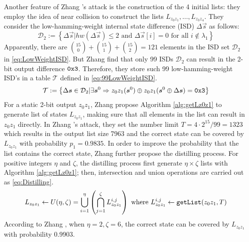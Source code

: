 Another feature of Zhang \etal's attack is the construction of the 4 initial lists: they employ the idea of near collision to construct the lists $L_{z_0z_1},\ldots, L_{z_3z_4}$.
They consider the low-hamming-weight internal state difference (ISD) $\Delta \vec{s}$ as follows:
\begin{equation}\label{eq:LowWeightISD}
  \mathcal{D}_2:=\left\{\Delta\vec{s}| hw(\Delta\vec{s})\leq 2 \text{ and } \Delta\vec{s}[i]=0  \text{ for all } i\notin\lambda_1 \right\}
\end{equation}
Apparently, there are $\binom{15}{0}+\binom{15}{1}+\binom{15}{2}=121$ elements in the ISD set $\mathcal{D}_2$ in \eqref{eq:LowWeightISD}.
But Zhang \etal find that only 99 ISDs $\mathcal{D}_2$ can result in the 2-bit output difference ${\tt 0x3}$.
Therefore, they store such 99 low-hamming-weight ISD's in a table $\mathcal{T}$ defined in \eqref{eq:99LowWeightISD}.
\begin{equation}\label{eq:99LowWeightISD}
  \mathcal{T}:=\left\{\Delta\vec{s}\in \mathcal{D}_2|
  \exists \vec{s}^0 \Rightarrow z_0z_1(\vec{s}^0)\oplus z_0z_1(\vec{s}^0\oplus \Delta\vec{s}) ={\tt 0x3}
  \right\}
\end{equation}
For a static 2-bit output $z_0z_1$,
Zhang \etal propose Algorithm \ref{alg:getLz0z1} to generate list of states $L_{z_0z_1}$, making sure that all elements in the list can result in  $z_0z_1$ directly.
In Zhang \etal's attack, they set the number limit $T=4\cdot 2^{15}/99=1323$ which results in the output list size 7963 and the correct state can be covered by $L_{z_0z_1}$ with probability $p_1=0.9835$.
In order to improve the probability that the list contains the correct state, Zhang \etal further propose the distilling process.
For positive integers $\eta$ and $\zeta$, the distilling process first generate $\eta\times \zeta$ lists with Algorithm \ref{alg:getLz0z1}; then, intersection and union operations are carried out as \eqref{eq:Distilling}.
\begin{equation}\label{eq:Distilling}
 L_{z_0z_1} \leftarrow U(\eta, \zeta)=
  \bigcup_{i=1}^{\eta}\left(\bigcap_{j=1}^\zeta L^{i,j}_{z_0z_1}\right)
  \text{ where }
  L^{i,j}_{z_0z_1}\leftarrow
  {\tt getList}(z_0z_1, T)
\end{equation}
According to Zhang \etal, when $\eta=2, \zeta=6$, the correct state can be covered by $L_{z_0z_1}$ with probability 0.9903.

